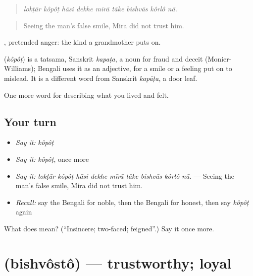 \begin{quote}
        
\end{quote}

\begin{quote}
\emph{lokṭār kôpôṭ hāsi dekhe mīrā tāke bishvās kôrlô nā.}
\end{quote}

\begin{quote}
Seeing the man's false smile, Mira did not trust him.
\end{quote}

 , pretended anger: the kind a grandmother puts on.

\begin{cousinweb}
\textbf{} (\emph{kôpôṭ}) is a tatsama, Sanskrit \emph{kapaṭa}, a noun for fraud and deceit (Monier-Williams); Bengali uses it as an adjective, for a smile or a feeling put on to mislead. It is a different word from Sanskrit \emph{kapāṭa}, a door leaf.
\end{cousinweb}

\begin{grammarlens}[title={What you've built}]
One more word for describing what you lived and felt.
\end{grammarlens}

\subsection*{Your turn}
\begin{itemize}
\raggedright
  \item \emph{Say it:} \emph{kôpôṭ}
  \item \emph{Say it:} \emph{kôpôṭ}, once more
  \item \emph{Say it:} \emph{lokṭār kôpôṭ hāsi dekhe mīrā tāke bishvās kôrlô nā.} — Seeing the man's false smile, Mira did not trust him.
  \item \emph{Recall:} say the Bengali for noble, then the Bengali for honest, then say \emph{kôpôṭ} again
\end{itemize}

\begin{tcolorbox}[breakable,colback=teal!4,colframe=teal!35!black,title={Before you move on}]
What does  mean? (\textquotedblleft{}Insincere; two-faced; feigned\textquotedblright{}.) Say it once more.
\end{tcolorbox}
\section[\texorpdfstring{\bn{বিশ্বস্ত} (bishvôstô)}{বিশ্বস্ত (bishvôstô)}]{ (bishvôstô) — trustworthy; loyal}

